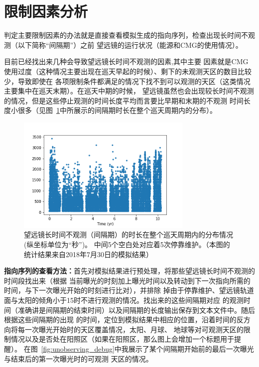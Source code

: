 \documentclass[a4paper,11pt]{ctexart}
\begin{document}
\section{限制因素分析}
\label{sec:analysis}
判定主要限制因素的办法就是直接查看模拟生成的指向序列，检查出现长时间不观测（以下简称“间隔期”）之前
望远镜的运行状况（能源和CMG的使用情况）。

目前已经找出来几种会导致望远镜长时间不观测的因素,其中主要
因素就是CMG使用过度（这种情况主要出现在巡天早起的时候）、剩下的未观测天区的数目比较少，导致即使在
各项限制条件都满足的情况下找不到可以观测的天区（这类情况主要集中在巡天末期）。在巡天中期的时候，
望远镜虽然也会出现较长时间不观测的情况，但是这些停止观测的时间长度平均而言要比早期和末期的不观测
时间长度小很多（见图~\ref{fig:time_wasted}中所展示的间隔期时长在整个巡天周期内的分布）。

\begin{figure}[h!]
\centering
\includegraphics[width=0.75\textwidth]{figures/dT_vs_time.png}
\caption{望远镜长时间不观测（间隔期）的时长在整个巡天周期内的分布情况(纵坐标单位为“秒”)。
中间5个空白处对应着5次停靠维护。（本图的统计结果来自2018年7月30日的模拟结果）}
\label{fig:time_wasted}
\end{figure}

\textbf{指向序列的查看方法：}首先对模拟结果进行预处理，将那些望远镜长时间不观测的时间段找出来（根据
当前曝光的时刻加上曝光时间以及转动到下一次指向所需的时间，与下一次曝光开始的时刻进行比对），并排除
掉由于停靠维护、望远镜轨道面与太阳的倾角小于15\textdegree 时不进行观测的情况。找出来的这些间隔期对应
的观测时间（准确讲是间隔期的结束时间）以及间隔期的长度输出保存到文本文件中。随后根据这些间隔期的出现
的时间，定位到模拟结果中相应的位置，沿着时间的反方向将每一次曝光开始时的天区覆盖情况，太阳、月球、
地球等对可观测天区的限制情况以及是否处在阳照区（如果在阳照区，那么图上会增加一个标题用于提醒）。
在图~\ref{fig:unobserving_debug}中我展示了某个间隔期开始前的最后一次曝光与结束后的第一次曝光时的可观测
天区的情况。
\end{document}
